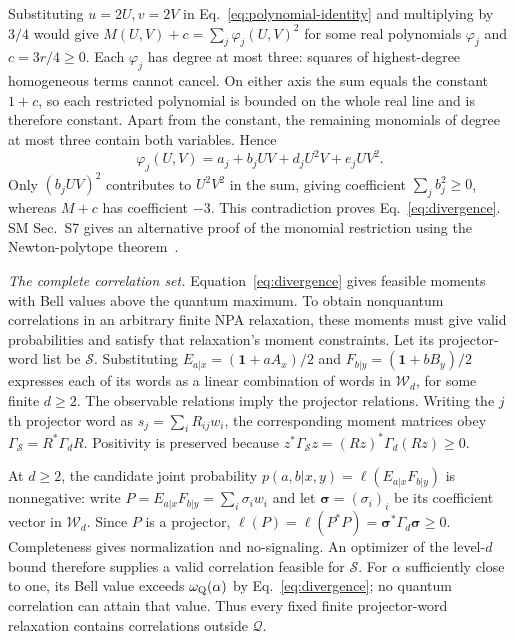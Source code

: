 \documentclass[aps,prl,twocolumn,10pt,superscriptaddress,nofootinbib,longbibliography,nobalancelastpage]{revtex4-2}
\newcommand{\Q}{\mathcal Q}
\newcommand{\id}{\mathbf 1}
\begin{document}
Substituting $u=2U,v=2V$ in Eq.~\eqref{eq:polynomial-identity} and multiplying by $3/4$ would give $M(U,V)+c=\sum_j\varphi_j(U,V)^2$ for some real polynomials $\varphi_j$ and $c=3r/4\geq0$. Each $\varphi_j$ has degree at most three: squares of highest-degree homogeneous terms cannot cancel. On either axis the sum equals the constant $1+c$, so each restricted polynomial is bounded on the whole real line and is therefore constant. Apart from the constant, the remaining monomials of degree at most three contain both variables. Hence
\[
\varphi_j(U,V)=a_j+b_jUV+d_jU^2V+e_jUV^2.
\]
Only $(b_jUV)^2$ contributes to $U^2V^2$ in the sum, giving coefficient $\sum_jb_j^2\geq0$, whereas $M+c$ has coefficient $-3$. This contradiction proves Eq.~\eqref{eq:divergence}. SM Sec.~S7 gives an alternative proof of the monomial restriction using the Newton-polytope theorem~\cite{Reznick1978}.

\emph{The complete correlation set.} Equation~\eqref{eq:divergence} gives feasible moments with Bell values above the quantum maximum. To obtain nonquantum correlations in an arbitrary finite NPA relaxation, these moments must give valid probabilities and satisfy that relaxation's moment constraints. Let its projector-word list be $\mathcal S$. Substituting $E_{a|x}=(\id+aA_x)/2$ and $F_{b|y}=(\id+bB_y)/2$ expresses each of its words as a linear combination of words in $\mathcal W_d$, for some finite $d\geq2$. The observable relations imply the projector relations. Writing the $j$th projector word as $s_j=\sum_iR_{ij}w_i$, the corresponding moment matrices obey $\Gamma_{\mathcal S}=R^*\Gamma_dR$. Positivity is preserved because $z^*\Gamma_{\mathcal S}z=(Rz)^*\Gamma_d(Rz)\geq0$.

At $d\geq2$, the candidate joint probability $p(a,b|x,y)=\ell(E_{a|x}F_{b|y})$ is nonnegative: write $P=E_{a|x}F_{b|y}=\sum_i\sigma_iw_i$ and let $\boldsymbol\sigma=(\sigma_i)_i$ be its coefficient vector in $\mathcal W_d$. Since $P$ is a projector, $\ell(P)=\ell(P^*P)=\boldsymbol\sigma^*\Gamma_d\boldsymbol\sigma\geq0$. Completeness gives normalization and no-signaling. An optimizer of the level-$d$ bound therefore supplies a valid correlation feasible for $\mathcal S$. For $\alpha$ sufficiently close to one, its Bell value exceeds $\omega_{\rm Q}(\alpha)$ by Eq.~\eqref{eq:divergence}; no quantum correlation can attain that value. Thus every fixed finite projector-word relaxation contains correlations outside $\Q$.
\end{document}
